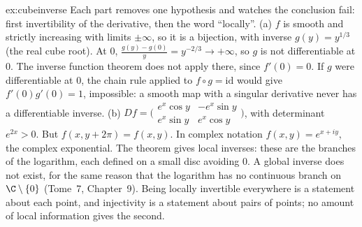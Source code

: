 \begin{solution}{ex:cubeinverse}
\idea Each part removes one hypothesis and watches the conclusion fail: first invertibility of the derivative, then the word ``locally''.
\writeup (a) $f$ is smooth and strictly increasing with limits $\pm\infty$, so it is a bijection, with inverse $g(y)=y^{1/3}$ (the real cube root). At $0$,
$\frac{g(y)-g(0)}y=y^{-2/3}\to+\infty$, so $g$ is not differentiable at $0$. The inverse function theorem does not apply there, since $f'(0)=0$. If $g$ were
differentiable at $0$, the chain rule applied to $f\circ g=\mathrm{id}$ would give $f'(0)g'(0)=1$, impossible: a smooth map with a singular derivative
never has a differentiable inverse. (b) $Df=\bigl(\begin{smallmatrix}e^x\cos y&-e^x\sin y\\ e^x\sin y&e^x\cos y\end{smallmatrix}\bigr)$, with determinant
$e^{2x}>0$. But $f(x,y+2\pi)=f(x,y)$. In complex notation $f(x,y)=e^{x+iy}$, the complex exponential. The theorem gives local inverses: these are the
branches of the logarithm, each defined on a small disc avoiding $0$. A global inverse does not exist, for the same reason that the logarithm has no
continuous branch on $\C\setminus\{0\}$ (Tome~7, Chapter~9). Being locally invertible everywhere is a statement about each point, and injectivity is a
statement about pairs of points; no amount of local information gives the second.
\end{solution}

